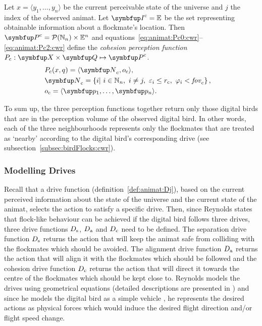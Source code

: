 \begin{definition}
  \label{def:animat:Pc:cwr}
  Let $x=\langle y_1,\ldots,y_n \rangle$ be the current perceivable state of the universe and $j$ the index of the observed animat. Let $\set{I}^\textnormal{c}=\E$ be the set representing obtainable information about a flockmate's location. Then $\set{P}^\textnormal{c}=\powset{\N_n} \times \E^n$ and equations~\eqref{eq:animat:Pc0:cwr}--\eqref{eq:animat:Pc2:cwr} define the \emph{cohesion perception function} $P_\textnormal{c}: \set{X} \times \set{Q} \mapsto \set{P}^\textnormal{c}$.
  \begin{eqnarray}
    & P_\textnormal{c}(x,q)=\langle\set{N}_\textnormal{c},o_\textnormal{c}\rangle, & \label{eq:animat:Pc0:cwr} \\
    & \set{N}_\textnormal{c}=\left\{i|\ i \in \N_n,\ i \neq j,\ \varepsilon_i%
     \leq r_\textnormal{c},\ \varphi_i%
     < \fov_\textnormal{c}\right\}, & \\
    & o_\textnormal{c}=\langle \vect{p}_1,\ldots,\vect{p}_n\rangle. & \label{eq:animat:Pc2:cwr}
  \end{eqnarray}
\end{definition}

To sum up, the three perception functions together return only those digital birds that are in the perception volume of the observed digital bird. In other words, each of the three neighbourhoods represents only the flockmates that are treated as `nearby' according to the digital bird's corresponding drive \cite{reynolds:1987} (see subsection~\ref{subsec:birdFlocks:cwr}).

\subsubsection{Modelling Drives}
Recall that a drive function (definition~\ref{def:animat:Dj}), based on the current perceived information about the state of the universe and the current state of the animat, selects the action to satisfy a specific drive. Then, since Reynolds states that flock-like behaviour can be achieved if the digital bird follows three drives, three drive functions $D_\textnormal{s}$, $D_\textnormal{a}$ and $D_\textnormal{c}$ need to be defined. The separation drive function $D_\textnormal{s}$ returns the action that will keep the animat safe from colliding with the flockmates which should be avoided. The alignment drive function $D_\textnormal{a}$ returns the action that will align it with the flockmates which should be followed and the cohesion drive function $D_\textnormal{c}$ returns the action that will direct it towards the centre of the flockmates which should be kept close to. Reynolds models the drives using geometrical equations (detailed descriptions are presented in \cite{reynolds:1999}) and since he models the digital bird as a simple vehicle \cite{reynolds:1987,reynolds:1999}, he represents the desired actions as physical forces which would induce the desired flight direction and/or flight speed change.

